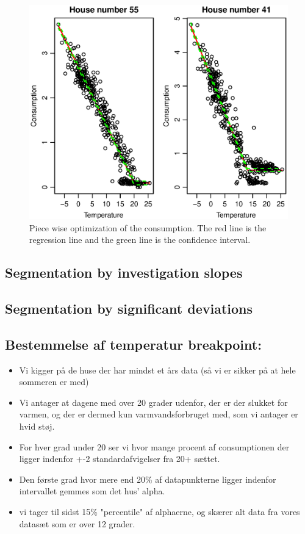 \begin{figure}[H]
    \centering
    \includegraphics[width=\textwidth]{../../../figures/Consumption-PW.eps}
    \caption{Piece wise optimization of the consumption. The red line is the regression line and the green line is the confidence interval.}
    \label{fig: Consumption-PW}
\end{figure}
\subsection*{Segmentation by investigation slopes}

\subsection*{Segmentation by significant deviations}

\subsection*{Bestemmelse af temperatur breakpoint:}
\begin{itemize}
    \item Vi kigger på de huse der har mindst et års data (så vi er sikker på at hele sommeren er med)
    \item Vi antager at dagene med over 20 grader udenfor, der er der slukket for varmen, og der er dermed kun varmvandsforbruget med, som vi antager er hvid støj.
    \item For hver grad under 20 ser vi hvor mange procent af consumptionen der ligger indenfor +-2 standardafvigelser fra 20+ sættet.
    \item Den første grad hvor mere end 20\% af datapunkterne ligger indenfor intervallet gemmes som det hus' alpha.
    \item vi tager til sidst 15\% "percentile" af alphaerne, og skærer alt data fra vores datasæt som er over 12 grader.
\end{itemize}

